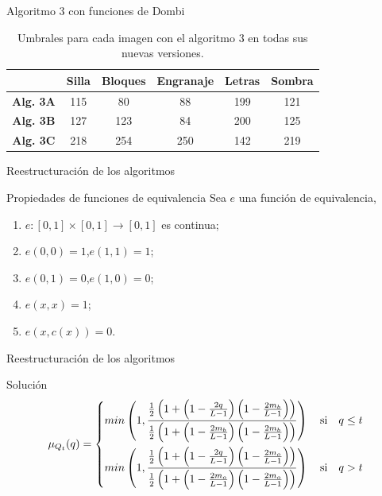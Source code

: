 \documentclass{beamer}
\theoremstyle{plain} %
\theoremstyle{definition}
\def\unmedio{\frac{1}{2}}
\def\unitinterval{[0,1]}
\newcommand{\unitspace}{\unitinterval \rightarrow \unitinterval}
\newcommand{\bb}{\bfseries}
\begin{document}
\begin{frame}{Algoritmo 3 con funciones de Dombi}
  \begin{table}
  \centering
  \begin{tabular}{c||c|c|c|c|c} 
               &\bb Silla&\bb Bloques&\bb Engranaje&\bb Letras&\bb Sombra\\\hline\hline
  \bb Alg. 3A  &   115   &    80    &     88      &    199   &    121   \\\hline
  \bb Alg. 3B  &   127   &    123    &     84      &    200   &    125   \\\hline
  \bb Alg. 3C  &   218   &    254    &     250     &    142   &    219   \\\hline
  \end{tabular}
  \caption{Umbrales para cada imagen con el algoritmo 3 en todas sus nuevas versiones.\label{tab:resultexp3dombi}}
  \end{table}
\end{frame}

\begin{frame}{Reestructuración de los algoritmos}
  \begin{block}{Propiedades de funciones de equivalencia}
  Sea $e$ una función de equivalencia,
  \begin{enumerate}
    \item $e:\unitinterval\times\unitspace$ es continua;
    \item $e(0,0)=1$,\quad$e(1,1)=1$;
    \item $e(0,1)=0$,\quad$e(1,0)=0$;
    \item $e(x,x)=1$;
    \item $e(x,c(x))=0$.
  \end{enumerate}
  \end{block}
\end{frame}

\begin{frame}{Reestructuración de los algoritmos}
  \begin{exampleblock}{Solución}
  \begin{equation*}\label{eq:intentodesolucionardombi}
    \mu_{Q_t}(q)=\left\{ \begin{split}
                 min\left( 1, \frac
                    {\unmedio \left(1+\left(1-\frac{2q}{L-1}\right)\left(1-\frac{2m_b}{L-1}\right)\right)}
                    {\unmedio \left(1+\left(1-\frac{2m_b}{L-1}\right)\left(1-\frac{2m_b}{L-1}\right)\right)}\right)
                 \text{\quad si\quad} q\leq t\\
                 min\left( 1, \frac
                    {\unmedio \left(1+\left(1-\frac{2q}{L-1}\right)\left(1-\frac{2m_o}{L-1}\right)\right)}
                    {\unmedio \left(1+\left(1-\frac{2m_o}{L-1}\right)\left(1-\frac{2m_o}{L-1}\right)\right)}\right)
                \text{\quad si\quad} q > t
                \end{split}\right.
\end{equation*}
  \end{exampleblock}
\end{frame}
\end{document}
